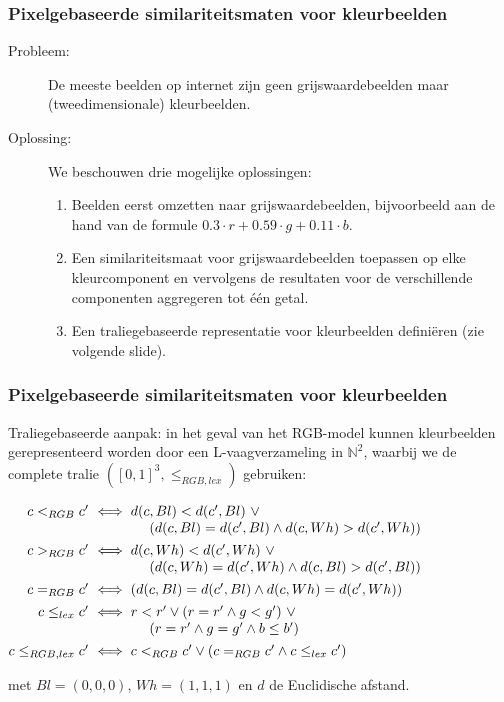 \documentclass[dutch]{beamer}
\theoremstyle{definition}
\theoremstyle{remark}
\theoremstyle{example}
\begin{document}
{
  \frametitle{Pixelgebaseerde similariteitsmaten voor kleurbeelden}
  
  \begin{description}
     \item[Probleem:] De meeste beelden op internet zijn 
     geen grijswaardebeelden maar (tweedimensionale) kleurbeelden.
     \item[Oplossing:] We beschouwen drie mogelijke oplossingen:
     \begin{enumerate}
       \item Beelden eerst omzetten naar grijswaardebeelden, bijvoorbeeld aan de 
       hand van de formule $0.3 \cdot r + 0.59 \cdot g + 0.11 \cdot b$.
       \item Een similariteitsmaat voor grijswaardebeelden toepassen op elke
       kleurcomponent en vervolgens de resultaten voor de verschillende componenten
       aggregeren tot \'e\'en getal.
       \item Een traliegebaseerde representatie voor kleurbeelden defini\"eren (zie
       volgende slide).
     \end{enumerate}
   \end{description}
}
\frame
{
  \frametitle{Pixelgebaseerde similariteitsmaten voor kleurbeelden}

  Traliegebaseerde aanpak: in het geval van het RGB-model kunnen kleurbeelden 
  gerepresenteerd worden door een L-vaagverzameling in $\mathbb{N}^2$,
  waarbij we de complete tralie $([0,1]^3, \le_{RGB,lex})$ gebruiken:
  \begin{minipage}{\textwidth}
  \vspace{7pt}
  \small
  \centering
  $\begin{array}{@{}r@{}l@{}}
   c <_{RGB} c' & \ \iff d(c,Bl) < d(c',Bl)\ \lor \\
			 & \ \qquad \qquad (d(c,Bl) = d(c',Bl) \land d(c,Wh) > d(c',Wh)) \\[4pt]
   c >_{RGB} c' & \ \iff d(c,Wh) < d(c',Wh)\ \lor \\
			 & \ \qquad \qquad (d(c,Wh) = d(c',Wh) \land d(c,Bl) > d(c',Bl)) \\[4pt]
   c =_{RGB} c' & \ \iff (d(c,Bl) = d(c',Bl) \land d(c,Wh) = d(c',Wh)) \\[4pt]
   c \leq_{lex} c' & \ \iff r < r' \lor (r = r' \land g < g')\ \lor \\
   			 & \ \qquad \qquad (r = r' \land g = g' \land b \leq b') \\[4pt]
   c \leq_{RGB,lex} c' & \ \iff c <_{RGB} c' \lor (c =_{RGB} c' \land c \leq_{lex} c')
  \end{array}$
  \vspace{7pt}
  \end{minipage}
  met $Bl = (0,0,0)$, $Wh = (1,1,1)$ en $d$ de Euclidische afstand.
}
\end{document}
